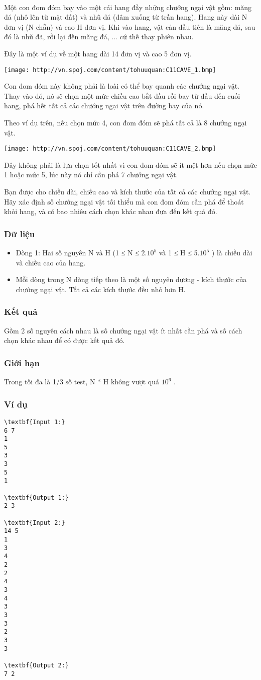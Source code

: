 

 

Một con đom đóm bay vào một cái hang đầy những chướng ngại vật gồm: măng đá (nhô lên từ mặt đất) và nhũ đá (đâm xuống từ trần hang). Hang này dài N đơn vị (N chẵn) và cao H đơn vị. Khi vào hang, vật cản đầu tiên là măng đá, sau đó là nhũ đã, rồi lại đến măng đá, ... cứ thế thay phiên nhau.

Đây là một ví dụ về một hang dài 14 đơn vị và cao 5 đơn vị.


\texttt{[image: http://vn.spoj.com/content/tohuuquan:C11CAVE\_1.bmp]}

Con đom đóm này không phải là loài có thể bay quanh các chướng ngại vật. Thay vào đó, nó sẽ chọn một mức chiều cao bắt đầu rồi bay từ đầu đến cuối hang, phá hết tất cả các chướng ngại vật trên đường bay của nó.

Theo ví dụ trên, nếu chọn mức 4, con đom đóm sẽ phá tất cả là 8 chướng ngại vật.


\texttt{[image: http://vn.spoj.com/content/tohuuquan:C11CAVE\_2.bmp]}

Đây không phải là lựa chọn tốt nhất vì con đom đóm sẽ ít mệt hơn nếu chọn mức 1 hoặc mức 5, lúc này nó chỉ cần phá 7 chướng ngại vật.

Bạn được cho chiều dài, chiều cao và kích thước của tất cả các chướng ngại vật. Hãy xác định số chướng ngại vật tối thiểu mà con đom đóm cần phá để thoát khỏi hang, và có bao nhiêu cách chọn khác nhau đưa đến kết quả đó.

\subsubsection{Dữ liệu}
\begin{itemize}
	\item Dòng 1: Hai số nguyên N và H (1 ≤ N ≤ 2.$10^{5}$ và 1 ≤ H ≤ 5.$10^{5}$ ) là chiều dài và chiều cao của hang.
	\item Mỗi dòng trong N dòng tiếp theo là một số nguyên dương - kích thước của chướng ngại vật. Tất cả các kích thước đều nhỏ hơn H.
\end{itemize}

\subsubsection{Kết quả}

Gồm 2 số nguyên cách nhau là số chướng ngại vật ít nhất cần phá và số cách chọn khác nhau để có được kết quả đó.

\subsubsection{Giới hạn}

Trong tối đa là 1/3 số test, N * H không vượt quá $10^{6}$ .

\subsubsection{Ví dụ}
\begin{verbatim}
\textbf{Input 1:}
6 7
1
5
3
3
5
1

\textbf{Output 1:}
2 3 

\textbf{Input 2:}
14 5
1
3
4
2
2
4
3
4
3
3
3
2
3
3

\textbf{Output 2:}
7 2\end{verbatim}
